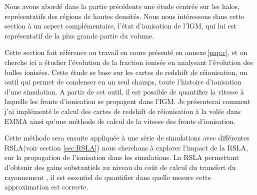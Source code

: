 Nous avons abordé dans la partie précédente une étude centrée sur les halos, représentatifs des régions de hautes densités. %
Nous nous intéressons dans cette section à un aspect complémentaire, l'état d'ionisation de l'\ac{IGM}, qui lui est représentatif de la plus grande partie du volume.

Cette section fait référence au travail en cours présenté en annexe\,\ref{pap:c}, et on cherche ici a étudier l’évolution de la fraction ionisée en analysant l'évolution des bulles ionisées.
Cette étude se base sur les cartes de redshift de réionisation, un outil qui permet de condenser en un seul champs, toute l'histoire d'ionisation d'une simulation.
A partir de cet outil, il est possible de quantifier la vitesse à laquelle les fronts d'ionisation se propagent dans l'\ac{IGM}.
Je présenterai comment j'ai implémenté le calcul des cartes de redshift de réionisation à la volée dans EMMA ainsi qu'une méthode de calcul de la vitesse des fronts d'ionisation.

Cette méthode sera ensuite appliquée à une série de simulations avec différentes \ac{RSLA}(voir section \ref{sec:RSLA}) nous cherchons à explorer l'impact de la \ac{RSLA}, sur la propagation de l'ionisation dans les simulations.
La \ac{RSLA} permettant d'obtenir des gains substantiels au niveau du coût de calcul du transfert du rayonnement \citep{rosdahl_ramsesrt_2013, aubert_radiative_2008, 2001NewA....6..437G}, il est essentiel de quantifier dans quelle mesure cette approximation est correcte.




%


